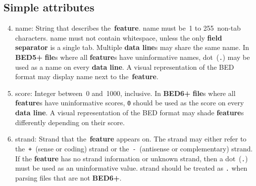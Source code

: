 \documentclass[11pt]{article}
\begin{document}
\subsection{Simple attributes}
\begin{enumerate}
  \setcounter{enumi}{3}

\item \textsf{name}: String that describes the~\textbf{feature}.
  \textsf{name} must be~1 to 255~non-tab characters.
  \textsf{name} must not contain whitespace, unless the only \textbf{field separator} is a single tab.
  Multiple \textbf{data line}s may share the same \textsf{name}.
  In \textbf{BED5+} \textbf{file}s where all \textbf{feature}s have uninformative \textsf{name}s, dot~(\texttt{.}) may be used as a \textsf{name} on every \textbf{data line}.
  A visual representation of the \ac{BED} format may display \textsf{name} next to the~\textbf{feature}.

\item \textsf{score}: Integer between~0 and~1000, inclusive.
  In \textbf{BED6+} \textbf{file}s where all \textbf{feature}s have uninformative \textsf{score}s, \texttt{0} should be used as the \textsf{score} on every \textbf{data line}.
  A visual representation of the \ac{BED} format may shade \textbf{feature}s differently depending on their \textsf{score}.

\item \textsf{strand}: Strand that the~\textbf{feature} appears on.
  The \textsf{strand} may either refer to the~\texttt{+}~(sense or coding) strand or the~\texttt{-}~(antisense or complementary) strand.
  If the \textbf{feature} has no \textsf{strand} information or unknown \textsf{strand}, then a dot~(\texttt{.}) must be used as an uninformative value.
  \textsf{strand} should be treated as \texttt{.} when parsing files that are not \textbf{BED6+}.
\end{enumerate}
\end{document}
